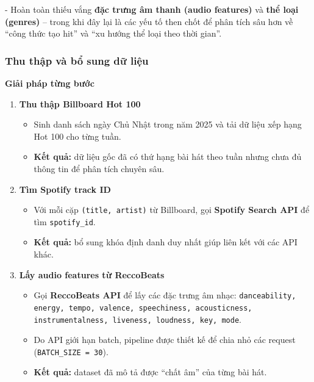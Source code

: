     - Hoàn toàn thiếu vắng \textbf{đặc trưng âm thanh (audio features)} 
    và \textbf{thể loại (genres)} – trong khi đây lại là các yếu tố then chốt để phân tích sâu hơn về “công thức tạo hit” và “xu hướng thể loại theo thời gian”. \\

    

\subsubsection{Thu thập và bổ sung dữ liệu }

\textbf{Giải pháp từng bước} 

\begin{enumerate}
    \item \textbf{Thu thập Billboard Hot 100}
    \begin{itemize}
        \item Sinh danh sách ngày Chủ Nhật trong năm 2025 và tải dữ liệu xếp hạng Hot 100 cho từng tuần. 
        \item \textbf{Kết quả:} dữ liệu gốc đã có thứ hạng bài hát theo tuần nhưng chưa đủ thông tin để phân tích chuyên sâu.
    \end{itemize}

    \item \textbf{Tìm Spotify track ID}
    \begin{itemize}
        \item Với mỗi cặp \texttt{(title, artist)} từ Billboard, gọi \textbf{Spotify Search API} để tìm \texttt{spotify\_id}. 
        \item  \textbf{Kết quả:} bổ sung khóa định danh duy nhất giúp liên kết với các API khác.
    \end{itemize}

    \item \textbf{Lấy audio features từ ReccoBeats}
    \begin{itemize}
        \item Gọi \textbf{ReccoBeats API} để lấy các đặc trưng âm nhạc: \texttt{danceability, energy, tempo, valence, speechiness, acousticness, instrumentalness, liveness, loudness, key, mode}.
        \item Do API giới hạn batch, pipeline được thiết kế để chia nhỏ các request (\texttt{BATCH\_SIZE = 30}). 
        \item \textbf{Kết quả:} dataset đã mô tả được ``chất âm'' của từng bài hát.
    \end{itemize}


\end{enumerate}
